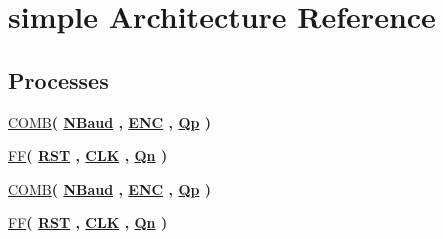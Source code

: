 \hypertarget{class_baud_rate_r_d_1_1simple}{}\section{simple Architecture Reference}
\label{class_baud_rate_r_d_1_1simple}
\subsection*{Processes}
 \begin{DoxyCompactItemize}
\item 
\hyperlink{class_baud_rate_r_d_1_1simple_a7c5259303f711b909a8f262d2c698da0}{C\+O\+M\+B}{\bfseries  ( {\bfseries {\bfseries \hyperlink{class_baud_rate_r_d_af99e9846fb1525d8781a8861c5405ac6}{N\+Baud}} \textcolor{vhdlchar}{ }} , {\bfseries {\bfseries \hyperlink{class_baud_rate_r_d_aa4e343f8d239d8a1a2c1bf5b3a6422bc}{E\+N\+C}} \textcolor{vhdlchar}{ }} , {\bfseries {\bfseries \hyperlink{class_baud_rate_r_d_1_1simple_a193e599da42febaea5351ec3bb05dc52}{Qp}} \textcolor{vhdlchar}{ }} )}
\item 
\hyperlink{class_baud_rate_r_d_1_1simple_ac931f6f7bfc069c5d4f1649ad9043e11}{F\+F}{\bfseries  ( {\bfseries {\bfseries \hyperlink{class_baud_rate_r_d_a98682ef7de2714e5bab788a2e2ff1b7f}{R\+S\+T}} \textcolor{vhdlchar}{ }} , {\bfseries {\bfseries \hyperlink{class_baud_rate_r_d_ab5d0ea9e968d49d94da9db07a979d402}{C\+L\+K}} \textcolor{vhdlchar}{ }} , {\bfseries {\bfseries \hyperlink{class_baud_rate_r_d_1_1simple_a4918b47ab83d6ff869ec1a9bda3866dd}{Qn}} \textcolor{vhdlchar}{ }} )}
\item 
\hyperlink{class_baud_rate_r_d_1_1simple_a7c5259303f711b909a8f262d2c698da0}{C\+O\+M\+B}{\bfseries  ( {\bfseries {\bfseries \hyperlink{class_baud_rate_r_d_af99e9846fb1525d8781a8861c5405ac6}{N\+Baud}} \textcolor{vhdlchar}{ }} , {\bfseries {\bfseries \hyperlink{class_baud_rate_r_d_aa4e343f8d239d8a1a2c1bf5b3a6422bc}{E\+N\+C}} \textcolor{vhdlchar}{ }} , {\bfseries {\bfseries \hyperlink{class_baud_rate_r_d_1_1simple_a193e599da42febaea5351ec3bb05dc52}{Qp}} \textcolor{vhdlchar}{ }} )}
\item 
\hyperlink{class_baud_rate_r_d_1_1simple_ac931f6f7bfc069c5d4f1649ad9043e11}{F\+F}{\bfseries  ( {\bfseries {\bfseries \hyperlink{class_baud_rate_r_d_a98682ef7de2714e5bab788a2e2ff1b7f}{R\+S\+T}} \textcolor{vhdlchar}{ }} , {\bfseries {\bfseries \hyperlink{class_baud_rate_r_d_ab5d0ea9e968d49d94da9db07a979d402}{C\+L\+K}} \textcolor{vhdlchar}{ }} , {\bfseries {\bfseries \hyperlink{class_baud_rate_r_d_1_1simple_a4918b47ab83d6ff869ec1a9bda3866dd}{Qn}} \textcolor{vhdlchar}{ }} )}
\end{DoxyCompactItemize}
